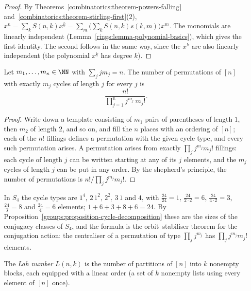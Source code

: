 \begin{proof}
By Theorems~\ref{combinatorics:theorem-powers-falling} and~\ref{combinatorics:theorem-stirling-first}(2), $x^n = \sum_kS(n, k)x^{\underline{k}} = \sum_m\bigl(\sum_kS(n, k)s(k, m)\bigr)x^m$. The
monomials are linearly independent (Lemma~\ref{rings:lemma-polynomial-basics}), which gives the first identity. The second follows in the same way, since the $x^{\underline{k}}$ are also linearly
independent (the polynomial $x^{\underline{k}}$ has degree $k$).
\end{proof}

\begin{proposition}\label{combinatorics:proposition-cycle-type}
Let $m_1, \ldots, m_n \in \NN$ with $\sum_jjm_j = n$. The number of permutations of $[n]$ with exactly $m_j$ cycles of length $j$ for every $j$ is
\[
\frac{n!}{\prod_{j=1}^{n}j^{m_j}\,m_j!} .
\]
\end{proposition}

\begin{proof}
Write down a template consisting of $m_1$ pairs of parentheses of length $1$, then $m_2$ of length $2$, and so on, and fill the $n$ places with an ordering of $[n]$; each of the $n!$ fillings defines a
permutation with the given cycle type, and every such permutation arises. A permutation arises from exactly $\prod_jj^{m_j}m_j!$ fillings: each cycle of length $j$ can be written starting at any of its
$j$ elements, and the $m_j$ cycles of length $j$ can be put in any order. By the shepherd's principle, the number of permutations is $n!/\prod_jj^{m_j}m_j!$.
\end{proof}

\begin{example}\label{combinatorics:example-cycle-types}
In $S_4$ the cycle types are $1^4$, $2\,1^2$, $2^2$, $3\,1$ and $4$, with $\frac{24}{24} = 1$, $\frac{24}{2 \cdot 2} = 6$, $\frac{24}{4 \cdot 2} = 3$, $\frac{24}{3} = 8$ and $\frac{24}{4} = 6$ elements;
$1 + 6 + 3 + 8 + 6 = 24$. By Proposition~\ref{groups:proposition-cycle-decomposition} these are the sizes of the conjugacy classes of $S_4$, and the formula is the orbit--stabiliser theorem for the
conjugation action: the centraliser of a permutation of type $\prod_jj^{m_j}$ has $\prod_jj^{m_j}m_j!$ elements.
\end{example}

\begin{definition}\label{combinatorics:definition-lah}
The \emph{Lah number} $L(n, k)$ is the number of partitions of $[n]$ into $k$ nonempty blocks, each equipped with a linear order (a set of $k$ nonempty lists using every element of $[n]$ once).
\end{definition}

